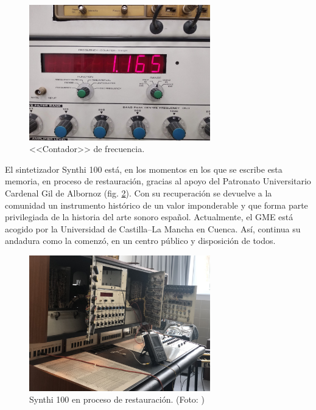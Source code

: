 \begin{figure}
	\centering
	\includegraphics[width=0.7\textwidth]{frequency_counter}
	\caption[<<Contador>> de frecuencia.]{<<Contador>> de frecuencia.}
	\label{fig:frequency_counter}
\end{figure}


El sintetizador Synthi 100 está, en los momentos en los que se escribe esta memoria, en proceso de restauración, gracias al apoyo del Patronato Universitario Cardenal Gil de Albornoz (fig. \ref{fig:en_restauracion}). Con su recuperación se devuelve a la comunidad un instrumento histórico de un valor imponderable y que forma parte privilegiada de la historia del arte sonoro español. Actualmente, el GME está acogido por la Universidad de Castilla--La Mancha en Cuenca. Así, continua su andadura como la comenzó, en un centro público y disposición de todos.

\begin{figure}
	\centering
	\includegraphics[width=0.7\textwidth]{en_restauracion}
	\caption[Synthi 100 en proceso de restauración.]{Synthi 100 en proceso de restauración. (Foto: )}
	\label{fig:en_restauracion}
\end{figure}


